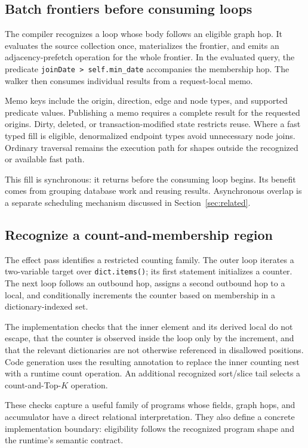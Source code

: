 \documentclass[sigconf,nonacm]{acmart}
\newcommand{\code}[1]{\texttt{#1}}
\begin{document}
\subsection{Batch frontiers before consuming loops}
The compiler recognizes a loop whose body follows an eligible graph hop. It
evaluates the source collection once, materializes the frontier, and emits an
adjacency-prefetch operation for the whole frontier. In the evaluated query,
the predicate \code{joinDate > self.min\_date} accompanies the membership hop.
The walker then consumes individual results from a request-local memo.

Memo keys include the origin, direction, edge and node types, and supported
predicate values. Publishing a memo requires a complete result for the
requested origins. Dirty, deleted, or transaction-modified state restricts
reuse. Where a fast typed fill is eligible, denormalized endpoint types avoid
unnecessary node joins. Ordinary traversal remains the execution path for
shapes outside the recognized or available fast path.

This fill is synchronous: it returns before the consuming loop begins. Its
benefit comes from grouping database work and reusing results. Asynchronous
overlap is a separate scheduling mechanism discussed in
Section~\ref{sec:related}.

\subsection{Recognize a count-and-membership region}
The effect pass identifies a restricted counting family. The outer loop
iterates a two-variable target over \code{dict.items()}; its first statement
initializes a counter. The next loop follows an outbound hop, assigns a second
outbound hop to a local, and conditionally increments the counter based on
membership in a dictionary-indexed set.

The implementation checks that the inner element and its derived local do
not escape, that the counter is observed inside the loop only by the
increment, and that the relevant dictionaries are not otherwise referenced
in disallowed positions. Code generation uses the resulting annotation to
replace the inner counting nest with a runtime count operation. An additional
recognized sort/slice tail selects a count-and-Top-$K$ operation.

These checks capture a useful family of programs whose fields, graph hops,
and accumulator have a direct relational interpretation. They also define a
concrete implementation boundary: eligibility follows the recognized program
shape and the runtime's semantic contract.
\end{document}

